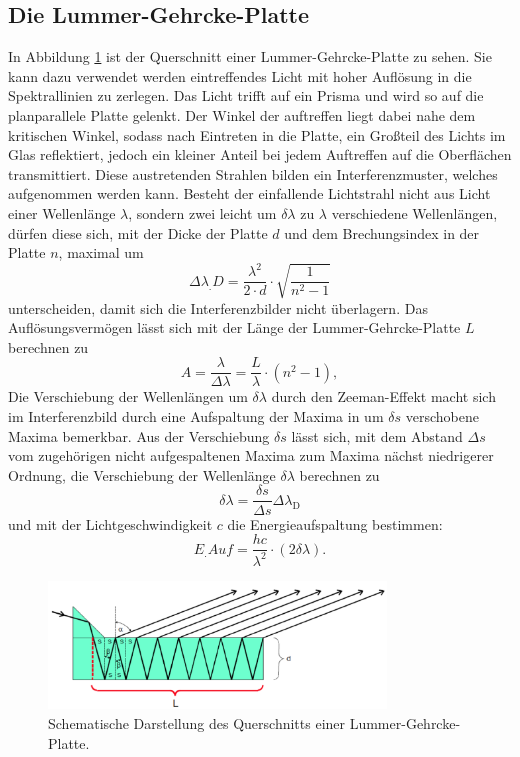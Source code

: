 \subsection{Die Lummer-Gehrcke-Platte}
In Abbildung \ref{fig:LGP} ist der Querschnitt einer Lummer-Gehrcke-Platte zu sehen.
Sie kann dazu verwendet werden eintreffendes Licht mit hoher Auflösung in die Spektrallinien zu zerlegen.
Das Licht trifft auf ein Prisma und wird so auf die planparallele Platte gelenkt. Der Winkel der auftreffen liegt dabei nahe dem kritischen Winkel, sodass nach Eintreten in die Platte, ein Großteil des Lichts im Glas reflektiert, jedoch ein kleiner Anteil bei jedem Auftreffen auf die Oberflächen transmittiert. Diese austretenden Strahlen bilden ein Interferenzmuster, welches aufgenommen werden kann.
Besteht der einfallende Lichtstrahl nicht aus Licht einer Wellenlänge $\lambda$, sondern zwei leicht um $\delta \lambda$ zu $\lambda$ verschiedene Wellenlängen, dürfen diese sich, mit der Dicke der Platte $d$ und dem Brechungsindex in der Platte $n$, maximal um
\begin{equation}
	\Delta\lambda_.{D} = \frac{\lambda^2}{2 \cdot d} \cdot \sqrt{\frac{1}{n^2-1}} \label{eq:disGebiet}
\end{equation}
unterscheiden, damit sich die Interferenzbilder nicht überlagern.
Das Auflösungsvermögen lässt sich mit der Länge der Lummer-Gehrcke-Platte $L$ berechnen zu
\begin{equation}
	A = \frac{\lambda}{\Delta\lambda} = \frac{L}{\lambda} \cdot \left(n^2-1\right), \label{eq:Aufloesung}
\end{equation}
Die Verschiebung der Wellenlängen um $\delta \lambda$ durch den Zeeman-Effekt macht sich im Interferenzbild durch eine Aufspaltung der Maxima in um $\delta s $ verschobene Maxima bemerkbar. Aus der Verschiebung $\delta s$ lässt sich, mit dem Abstand $\Delta s$ vom zugehörigen nicht aufgespaltenen Maxima zum Maxima nächst niedrigerer Ordnung, die Verschiebung der Wellenlänge $\delta \lambda$ berechnen zu
\begin{equation}
\delta \lambda = \frac{\delta s}{\Delta s} \Delta\lambda_\text{D} \label{eq:deltaLambda}
\end{equation}
und mit der Lichtgeschwindigkeit $c$ die Energieaufspaltung bestimmen:
\begin{equation}
E_.{Auf}=\frac{h c}{\lambda^2} \cdot (2\delta \lambda)\text{.} \label{eq:EaufExp}
\end{equation}

\begin{figure}
\centering
\includegraphics[width=0.8\textwidth]{content/images/LGP.pdf}
\caption{Schematische Darstellung des Querschnitts einer Lummer-Gehrcke-Platte.\cite{V27}}
\label{fig:LGP}
\end{figure}

